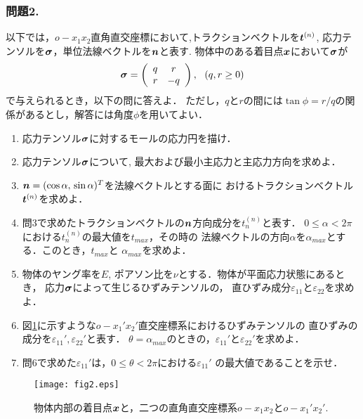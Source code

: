 \documentclass[10pt,a4j]{jarticle}
\begin{document}
\subsubsection*{問題2.}
以下では，$o-x_1x_2$直角直交座標において,トラクションベクトルを$\mbox{\boldmath $t$}^{(n)}$, 
応力テンソルを$\mbox{\boldmath $\sigma$}$，単位法線ベクトルを$\mbox{\boldmath $n$}$と表す.
物体中のある着目点$\mbox{\boldmath $x$}$において$\mbox{\boldmath $\sigma$}$が
\[
	\mbox{\boldmath $\sigma$}=
	\left(
	\begin{array}{cc}
		q &  r \\
		r & -q 
	\end{array}
	\right), \ \ (q,r \geq 0)
\]
で与えられるとき，以下の問に答えよ．
ただし，$q$と$r$の間には$\tan\phi =r/q$の関係があるとし，解答には角度$\phi$を用いてよい．
\begin{enumerate}
\item
	応力テンソル$\mbox{\boldmath $\sigma$}$に対するモールの応力円を描け．
\item
	応力テンソル$\mbox{\boldmath $\sigma$}$について, 最大および最小主応力と主応力方向を求めよ．
\item
	$\mbox{\boldmath $n$}=(\cos\alpha,\, \sin\alpha)^T$を法線ベクトルとする面に
	おけるトラクションベクトル$\mbox{\boldmath $t$}^{(n)}$を求めよ．
\item
	問3で求めたトラクションベクトルの$\mbox{\boldmath $n$}$方向成分を$t^{(n)}_n$と表す．
	$0\leq \alpha < 2\pi$における$t^{(n)}_n$の最大値を$t_{max}$，その時の
	法線ベクトルの方向$\alpha$を$\alpha_{max}$とする．このとき，$t_{max}$と
	$\alpha_{max}$を求めよ．
\item
	物体のヤング率を$E$, ポアソン比を$\nu$とする．物体が平面応力状態にあるとき，
	応力$\mbox{\boldmath $\sigma$}$によって生じるひずみテンソルの，
	直ひずみ成分$\varepsilon_{11}$と$\varepsilon_{22}$を求めよ．
\item
	図\ref{fig:fig2}に示すような$o-x_1'x_2'$直交座標系におけるひずみテンソルの
	直ひずみの成分を$\varepsilon_{11}',\varepsilon_{22}'$と表す．
	$\theta=\alpha_{max}$のときの，$\varepsilon_{11}'$と$\varepsilon_{22}'$を求めよ．
\item
	問6で求めた$\varepsilon_{11}'$は，$0 \leq \theta < 2\pi$における$\varepsilon_{11}'$
		の最大値であることを示せ．
\end{enumerate}
\begin{figure}[h]
	\begin{center}
	\texttt{[image: fig2.eps]} 
	\end{center}
	\caption{物体内部の着目点$\mbox{\boldmath $x$}$と，二つの直角直交座標系$o-x_1x_2$と$o-x_1'x_2'$.} 
	\label{fig:fig2}
\end{figure}
\end{document}
